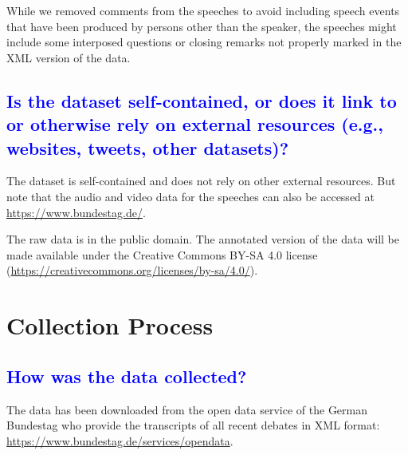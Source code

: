 \documentclass[letterpaper, 10 pt, conference]{ieeeconf}  %
\begin{document}
While we removed comments from the speeches to avoid including speech events that have been produced by persons other than the speaker, the speeches might include some interposed questions or closing remarks not properly marked in the XML version of the data.



\textcolor{blue}{\subsection{Is the dataset self-contained, or does it link to or otherwise rely on external resources (e.g., websites, tweets, other datasets)?}} %

The dataset is self-contained and does not rely on other external resources. But note that the audio and video data for the speeches can also be accessed at \url{https://www.bundestag.de/}.

The raw data is in the public domain. The annotated version of the data will be made available under the Creative Commons BY-SA 4.0 license (\url{https://creativecommons.org/licenses/by-sa/4.0/}).


\vspace{1.4cm}

\section{Collection Process}
\label{sec:collection}

\textcolor{blue}{\subsection{How was the data collected?}}

The data has been downloaded from the open data service of the German Bundestag who provide the transcripts of all recent debates in XML format: \url{https://www.bundestag.de/services/opendata}.
\end{document}
